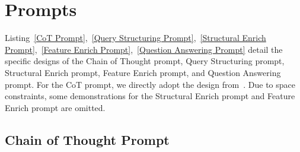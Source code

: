 \documentclass[11pt]{article}
\begin{document}
\begin{table}[H]
\centering
{}
\caption{Answer distribution proportion of WebQSP and CWQ}
\label{Answer Distribution Proportion of WebQSP and CWQ}
\end{table}

\section{Prompts}
Listing~\ref{CoT Prompt},~\ref{Query Structuring Prompt},~\ref{Structural Enrich Prompt},~\ref{Feature Enrich Prompt},~\ref{Question Answering Prompt} detail the specific designs of the Chain of Thought prompt, Query Structuring prompt, Structural Enrich prompt, Feature Enrich prompt, and Question Answering prompt. For the CoT prompt, we directly adopt the design from~\cite{sun2023thinkongraph}. Due to space constraints, some demonstrations for the Structural Enrich prompt and Feature Enrich prompt are omitted.
\subsection{Chain of Thought Prompt}

\end{document}
